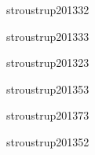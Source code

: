 \begin{syllabus}
\begin{unit}{\ALBasicAnalysisDef}{stroustrup2013}{3}{2}
   \begin{topics}
      \item \ALBasicAnalysisTopicAsymptotic
      \item \ALBasicAnalysisTopicIdentifying
   \end{topics}
   \begin{learningoutcomes}
      \item \ALBasicAnalysisObjTHREE
   \end{learningoutcomes}
\end{unit}

\begin{unit}{\ALFundamentalAlgorithmsDef}{stroustrup2013}{3}{3}
    \ALFundamentalAlgorithmsAllTopics
    \ALFundamentalAlgorithmsAllObjectives
\end{unit}

\begin{unit}{\PLDeclarationsAndTypesDef}{stroustrup2013}{2}{3}
    \PLDeclarationsAndTypesAllTopics
    \PLDeclarationsAndTypesAllObjectives
\end{unit}

\begin{unit}{\PLAbstractionMechanismsDef}{stroustrup2013}{5}{3}
    \PLAbstractionMechanismsAllTopics
    \PLAbstractionMechanismsAllTopics
\end{unit}

\begin{unit}{\PLObjectOrientedProgrammingDef}{stroustrup2013}{7}{3}
    \PLObjectOrientedProgrammingAllTopics
    \PLObjectOrientedProgrammingAllObjectives
\end{unit}

\begin{unit}{\SESoftwareDesignDef}{stroustrup2013}{5}{2}
   \begin{topics}
	\item \SESoftwareDesignTopicFundamental%
	\item \SESoftwareDesignTopicTherole%
	\item \SESoftwareDesignTopicDesignPatterns%
   \end{topics}
   \begin{learningoutcomes}
      \item \SESoftwareDesignObjONE
      \item \SESoftwareDesignObjFIVE
   \end{learningoutcomes}
\end{unit}


\end{syllabus}
